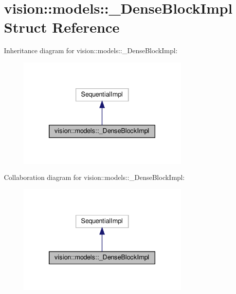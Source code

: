 \hypertarget{structvision_1_1models_1_1__DenseBlockImpl}{}\section{vision\+:\+:models\+:\+:\+\_\+\+Dense\+Block\+Impl Struct Reference}
\label{structvision_1_1models_1_1__DenseBlockImpl}


Inheritance diagram for vision\+:\+:models\+:\+:\+\_\+\+Dense\+Block\+Impl\+:
\nopagebreak
\begin{figure}[H]
\begin{center}
\leavevmode
\includegraphics[width=243pt]{structvision_1_1models_1_1__DenseBlockImpl__inherit__graph}
\end{center}
\end{figure}


Collaboration diagram for vision\+:\+:models\+:\+:\+\_\+\+Dense\+Block\+Impl\+:
\nopagebreak
\begin{figure}[H]
\begin{center}
\leavevmode
\includegraphics[width=243pt]{structvision_1_1models_1_1__DenseBlockImpl__coll__graph}
\end{center}
\end{figure}
